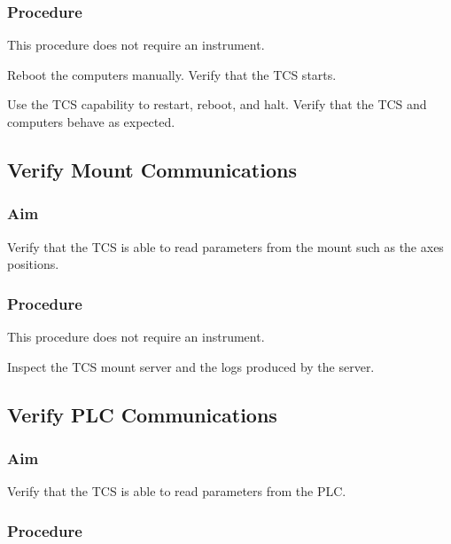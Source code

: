 \documentclass{article}
\begin{document}
\subsubsection{Procedure}

This procedure does not require an instrument.

Reboot the computers manually. Verify that the TCS starts.

Use the TCS capability to restart, reboot, and halt. Verify that the TCS and computers behave as expected.


\subsection{Verify Mount Communications}

\subsubsection{Aim}

Verify that the TCS is able to read parameters from the mount such as the axes positions.

\subsubsection{Procedure}

This procedure does not require an instrument.

Inspect the TCS mount server and the logs produced by the server.


\subsection{Verify PLC Communications}

\subsubsection{Aim}

Verify that the TCS is able to read parameters from the PLC.

\subsubsection{Procedure}
\end{document}
